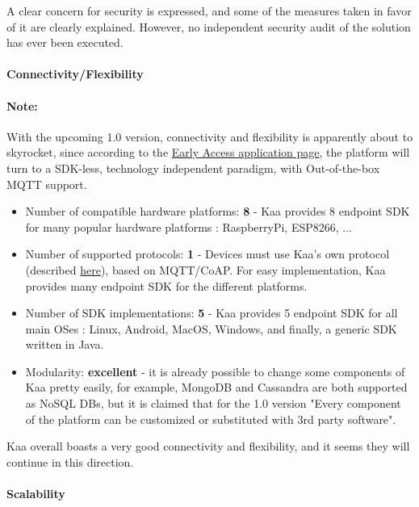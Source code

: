\documentclass{article}
\begin{document}
A clear concern for security is expressed, and some of the measures taken in favor of it are clearly explained. However, no independent security audit of the solution has ever been executed.

\paragraph{Connectivity/Flexibility}

\paragraph{Note:} With the upcoming 1.0 version, connectivity and flexibility is apparently about to skyrocket, since according to the \href{https://www.kaaproject.org/apply-for-early-access-to-kaa-1-0-banana-beach/}{Early Access application page}, the platform will turn to a SDK-less, technology independent paradigm, with Out-of-the-box MQTT support.

\begin{itemize}
\item Number of compatible hardware platforms: \textbf{8} - Kaa provides 8 endpoint SDK for many popular hardware platforms : RaspberryPi, ESP8266, ...
\item Number of supported protocols: \textbf{1} - Devices must use Kaa's own protocol (described \href{https://github.com/kaaproject/kaa-rfcs/}{here}), based on MQTT/CoAP. For easy implementation, Kaa provides many endpoint SDK for the different platforms.
\item Number of SDK implementations: \textbf{5} - Kaa provides 5 endpoint SDK for all main OSes : Linux, Android, MacOS, Windows, and finally, a generic SDK written in Java.
\item Modularity: \textbf{excellent} - it is already possible to change some components of Kaa pretty easily, for example, MongoDB and Cassandra are both supported as NoSQL DBs, but it is claimed that for the 1.0 version "Every component of the platform can be customized or substituted with 3rd party software".
\end{itemize}

Kaa overall boasts a very good connectivity and flexibility, and it seems they will continue in this direction.

\paragraph{Scalability}
\end{document}
